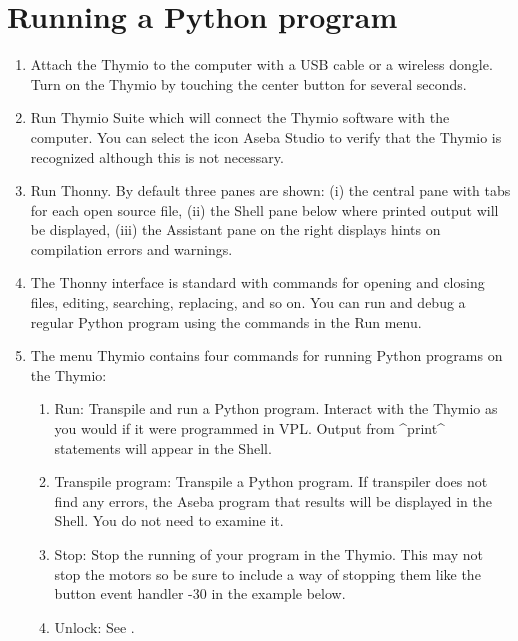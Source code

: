 \documentclass[11pt,a4paper]{article}
\newcommand*{\li}[1]{{\footnotesize\textsf{\ddag #1}}}
\newcommand*{\bu}[1]{\textsf{\small #1}}
\begin{document}

\section{Running a Python program}\label{s.running}

\begin{enumerate}
\item Attach the Thymio to the computer with a USB cable or a wireless dongle. Turn on the Thymio by touching the center button for several seconds.
\item Run Thymio Suite which will connect the Thymio software with the computer. You can select the icon \bu{Aseba Studio} to verify that the Thymio is recognized although this is not necessary.
\item Run Thonny. By default three panes are shown: (i) the central pane with tabs for each open source file, (ii) the \bu{Shell} pane below where printed output will be displayed, (iii) the \bu{Assistant} pane on the right displays hints on compilation errors and warnings.
\item The Thonny interface is standard with commands for opening and closing files, editing, searching, replacing, and so on. You can run and debug a regular Python program using the commands in the \bu{Run} menu.
\item The menu \bu{Thymio} contains four commands for running Python programs on the Thymio:
\begin{enumerate}
\item \bu{Run}: Transpile and run a Python program. Interact with the Thymio as you would if it were programmed in VPL. Output from ^print^ statements will appear in the \bu{Shell}.
\item \bu{Transpile program}: Transpile a Python program. If transpiler does not find any errors, the Aseba program that results will be  displayed in the \bu{Shell}. You do not need to examine it.
\item \bu{Stop}: Stop the running of your program in the Thymio. This may not stop the motors so be sure to include a way of stopping them like the button event handler \li{14-30} in the example below.

\item \bu{Unlock}: See \cite{tdm}.
\end{enumerate}

\end{enumerate}
\end{document}
